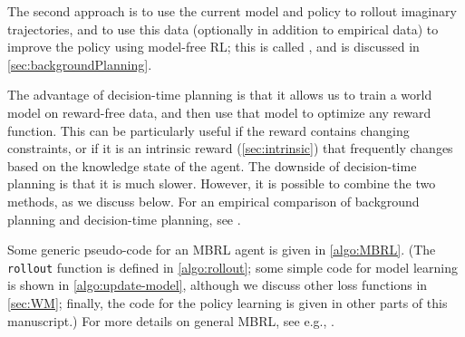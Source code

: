 The second approach is to use the current model and policy
to rollout imaginary trajectories,
and to use this data
(optionally in addition to empirical data)
to  improve the policy using model-free RL;
this is called ,
and is discussed in \cref{sec:backgroundPlanning}.


The advantage of decision-time planning is that
it  allows us to train a world model on reward-free data,
and then use that model
to optimize any reward function.
This can be particularly useful if the reward
contains changing constraints,
or if it is  an intrinsic reward (\cref{sec:intrinsic})
that frequently changes based on the knowledge state of the agent.
The downside of decision-time planning is that it is much slower.
However, it is possible to combine the two methods, as we discuss below.
For an empirical comparison of
background planning and decision-time planning,
see  \citep{Alver2024background}.

Some generic pseudo-code for an MBRL agent is given
in \cref{algo:MBRL}.
(The {\tt rollout} function is defined in \cref{algo:rollout};
some simple  code for model learning is
shown in \cref{algo:update-model},
although we discuss other loss functions in  \cref{sec:WM};
finally, the code for the policy learning is given in other parts of this manuscript.)
For more details on general MBRL, see
e.g., \citep{Wang2019MBRL,Moerland2023,Plaat2021}.



